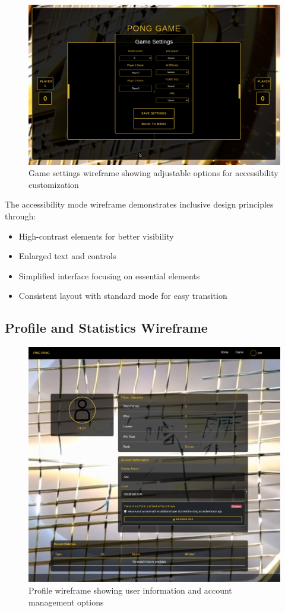 \begin{figure}[H]
    \centering
    \includegraphics[width=0.7\linewidth]{Figures/images/new_images/GameSettings.png}
    \caption{Game settings wireframe showing adjustable options for accessibility customization}
    \label{fig:wireframe-accessibility-settings}
\end{figure}

The accessibility mode wireframe demonstrates inclusive design principles through:
\begin{itemize}
    \item High-contrast elements for better visibility
    \item Enlarged text and controls
    \item Simplified interface focusing on essential elements
    \item Consistent layout with standard mode for easy transition
\end{itemize}

\subsection{Profile and Statistics Wireframe}

\begin{figure}[H]
    \centering
    \includegraphics[width=0.7\linewidth]{Figures/images/new_images/ProfilePage.png}
    \caption{Profile wireframe showing user information and account management options}
    \label{fig:wireframe-profile}
\end{figure}

